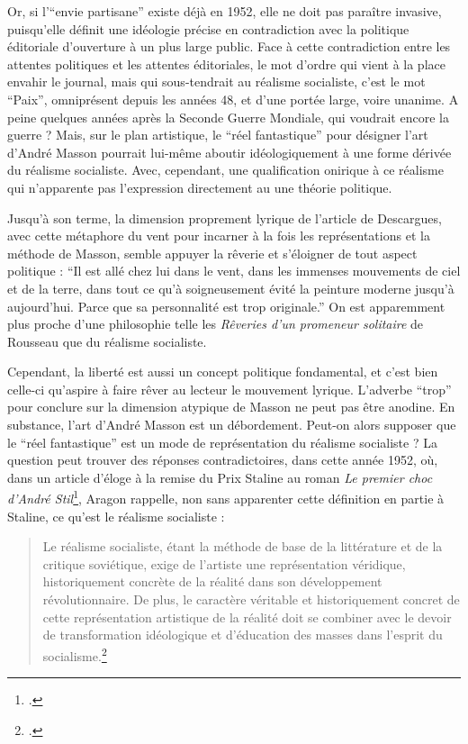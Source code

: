Or, si l’\enquote{envie partisane} existe déjà en 1952, elle ne doit pas paraître invasive, puisqu’elle définit une idéologie précise en contradiction avec la politique éditoriale d’ouverture à un plus large public. Face à cette contradiction entre les attentes politiques et les attentes éditoriales, le mot d’ordre qui vient à la place envahir le journal, mais qui sous-tendrait au réalisme socialiste, c’est le mot \enquote{Paix}, omniprésent depuis les années 48, et d’une portée large, voire unanime. A peine quelques années après la Seconde Guerre Mondiale, qui voudrait encore la guerre ? Mais, sur le plan artistique, le \enquote{réel fantastique} pour désigner l’art d’André Masson pourrait lui-même aboutir idéologiquement à une forme dérivée du réalisme socialiste. Avec, cependant, une qualification onirique à ce réalisme qui n’apparente pas l’expression directement au une théorie politique. 

Jusqu’à son terme, la dimension proprement lyrique de l’article de Descargues, avec cette métaphore du vent pour incarner à la fois les représentations et la méthode de Masson, semble appuyer la rêverie et s’éloigner de tout aspect politique : \enquote{Il est allé chez lui dans le vent, dans les immenses mouvements de ciel et de la terre, dans tout ce qu’à soigneusement évité la peinture moderne jusqu’à aujourd’hui. Parce que sa personnalité est trop originale.} On est apparemment plus proche d’une philosophie telle les \emph{Rêveries d’un promeneur solitaire} de Rousseau que du réalisme socialiste. 

	Cependant, la liberté est aussi un concept politique fondamental, et c’est bien celle-ci qu’aspire à faire rêver au lecteur le mouvement lyrique. L’adverbe \enquote{trop} pour conclure sur la dimension atypique de Masson ne peut pas être anodine. En substance, l’art d’André Masson est un débordement. Peut-on alors supposer que le \enquote{réel fantastique} est un mode de représentation du réalisme socialiste ? La question peut trouver des réponses contradictoires, dans cette année 1952, où, dans un article d’éloge à la remise du Prix Staline au roman \emph{Le premier choc d’André Stil}\footcite{prixstaline}, Aragon rappelle, non sans apparenter cette définition en partie à Staline, ce qu’est le réalisme socialiste : 
	\begin{quote}
	Le réalisme socialiste, étant la méthode de base de la littérature et de la critique soviétique, exige de l’artiste une représentation véridique, historiquement concrète de la réalité dans son développement révolutionnaire. De plus, le caractère véritable et historiquement concret de cette représentation artistique de la réalité doit se combiner avec le devoir de transformation idéologique et d’éducation des masses dans l’esprit du socialisme.\footcite{prixstaline}\end{quote}
	

